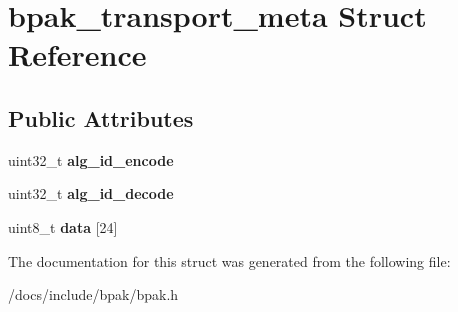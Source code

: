 \hypertarget{structbpak__transport__meta}{}\section{bpak\+\_\+transport\+\_\+meta Struct Reference}
\label{structbpak__transport__meta}
\subsection*{Public Attributes}
\begin{DoxyCompactItemize}
\item 
\mbox{\label{structbpak__transport__meta_abcf65d121bf0ceb3f596c17394bc7e7e}} 
uint32\+\_\+t {\bfseries alg\+\_\+id\+\_\+encode}
\item 
\mbox{\label{structbpak__transport__meta_a21ce6898206e76dd2f0b136972f19170}} 
uint32\+\_\+t {\bfseries alg\+\_\+id\+\_\+decode}
\item 
\mbox{\label{structbpak__transport__meta_adb6148d2c55ddf74cd7dec1af505b7e2}} 
uint8\+\_\+t {\bfseries data} \mbox{[}24\mbox{]}
\end{DoxyCompactItemize}


The documentation for this struct was generated from the following file\+:\begin{DoxyCompactItemize}
\item 
/docs/include/bpak/bpak.\+h\end{DoxyCompactItemize}
